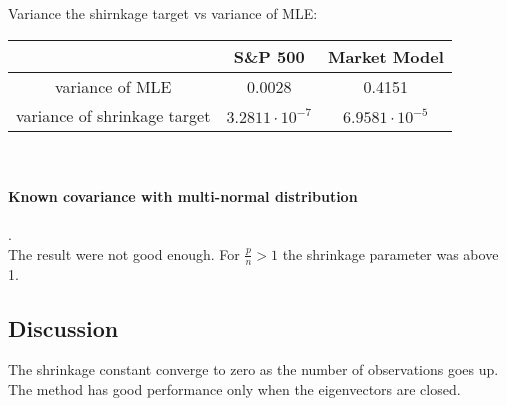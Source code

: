 \documentclass[letterpaper]{article}
\begin{document}
	\\
	\\
	Variance the shirnkage target vs  variance of MLE:\\
	\begin{tabular}{|c|c|c|}
		\hline 
		& \textbf{S\&P 500} & \textbf{Market Model} \\ 
		\hline 
		variance of MLE & 0.0028 &  0.4151 \\ 
		\hline 
		variance of shrinkage target & \(3.2811 \cdot 10^{-7}\) &  \(6.9581 \cdot 10^{-5}\) \\ 
		\hline 
	\end{tabular}\\
	

	\paragraph{Known covariance with multi-normal distribution}.\\
	The result were not good enough. For \(\frac{p}{n} > 1 \) the shrinkage parameter was above 1.   
	
	\subsection{Discussion}
	The shrinkage constant converge to zero as the number of observations goes up. \\
	The method has good performance only when the eigenvectors are closed.

	
	 
	
	\newpage
	\printbibliography
	
\end{document}
